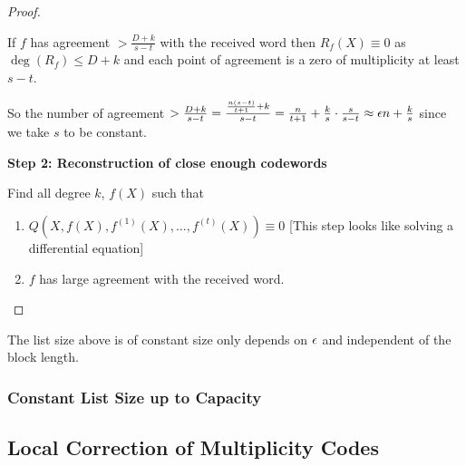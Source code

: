 \begin{proof}
\begin{observation}
    If $f$ has agreement $>\frac{D+k}{s-t}$ with the received word then $R_f(X)\equiv 0$ as $\deg(R_f)\leq D+k$ and each point of agreement is a zero of multiplicity at least $s-t$.
\end{observation}
So the number of agreement $>\frac{D+k}{s-t}=\frac{\frac{n(s-t)}{t+1}+k}{s-t}=\frac{n}{t+1}+\frac{k}{s}\cdot \frac{s}{s-t}\approx \epsilon n+\frac{k}{s}$ since we take $s$ to be constant. \parinf\vspace*{5mm}

\textbf{Step 2: Reconstruction of close enough codewords}\parinn

Find all degree $k$, $f(X)$ such that \begin{enumerate}
    \item $Q(X,f(X), f^{(1)}(X),\dots, f^{(t)}(X))\equiv 0$ [This step looks like solving a differential equation]
    \item $f$ has large agreement with the received word.
\end{enumerate}

\end{proof}
\begin{Theorem}{\cite{KoppartyRonZewiSarafWootters_2018_IDo_CONF}}{}
The list size above is of constant size only depends on $\epsilon$ and independent of the block length.
\end{Theorem}


\subsubsection{Constant List Size up to Capacity}
\subsection{Local Correction of Multiplicity Codes}